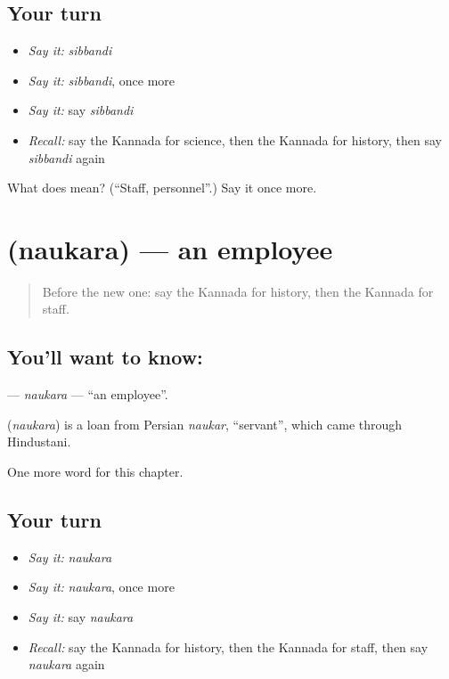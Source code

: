 \subsection*{Your turn}
\begin{itemize}
\raggedright
  \item \emph{Say it:} \emph{sibbandi}
  \item \emph{Say it:} \emph{sibbandi}, once more
  \item \emph{Say it:} say \emph{sibbandi}
  \item \emph{Recall:} say the Kannada for science, then the Kannada for history, then say \emph{sibbandi} again
\end{itemize}

\begin{tcolorbox}[breakable,colback=teal!4,colframe=teal!35!black,title={Before you move on}]
What does  mean? (\textquotedblleft{}Staff, personnel\textquotedblright{}.) Say it once more.
\end{tcolorbox}
\section[\texorpdfstring{\kn{ನೌಕರ} (naukara)}{ನೌಕರ (naukara)}]{ (naukara) — an employee}

\label{lesson:KA-C234-naukara}



\begin{quote}
Before the new one: say the Kannada for history, then the Kannada for staff.
\end{quote}

\subsection*{You'll want to know: }
\textbf{} — \emph{naukara} — \textquotedblleft{}an employee\textquotedblright{}.

\begin{cousinweb}
\textbf{} (\emph{naukara}) is a loan from Persian \emph{naukar}, \textquotedblleft{}servant\textquotedblright{}, which came through Hindustani.
\end{cousinweb}

\begin{grammarlens}[title={What you've built}]
One more word for this chapter.
\end{grammarlens}

\subsection*{Your turn}
\begin{itemize}
\raggedright
  \item \emph{Say it:} \emph{naukara}
  \item \emph{Say it:} \emph{naukara}, once more
  \item \emph{Say it:} say \emph{naukara}
  \item \emph{Recall:} say the Kannada for history, then the Kannada for staff, then say \emph{naukara} again
\end{itemize}

